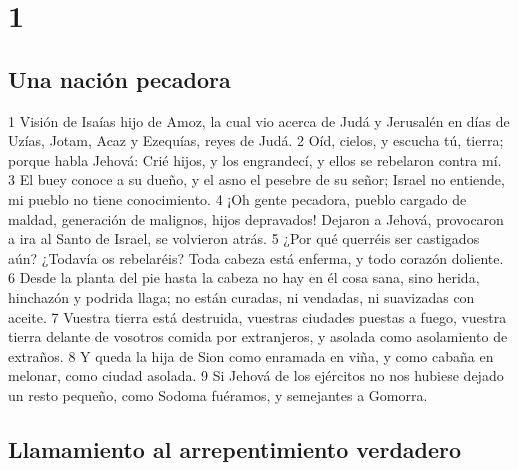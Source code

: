 
\chapter{1}

\section*{Una nación pecadora}

1 Visión de Isaías hijo de Amoz, la cual vio acerca de Judá y Jerusalén en días de Uzías, Jotam, Acaz y Ezequías, reyes de Judá.
2 Oíd, cielos, y escucha tú, tierra; porque habla Jehová: Crié hijos, y los engrandecí, y ellos se rebelaron contra mí.
3 El buey conoce a su dueño, y el asno el pesebre de su señor; Israel no entiende, mi pueblo no tiene conocimiento.
4 ¡Oh gente pecadora, pueblo cargado de maldad, generación de malignos, hijos depravados! Dejaron a Jehová, provocaron a ira al Santo de Israel, se volvieron atrás.
5 ¿Por qué querréis ser castigados aún? ¿Todavía os rebelaréis? Toda cabeza está enferma, y todo corazón doliente.
6 Desde la planta del pie hasta la cabeza no hay en él cosa sana, sino herida, hinchazón y podrida llaga; no están curadas, ni vendadas, ni suavizadas con aceite.
7 Vuestra tierra está destruida, vuestras ciudades puestas a fuego, vuestra tierra delante de vosotros comida por extranjeros, y asolada como asolamiento de extraños.
8 Y queda la hija de Sion como enramada en viña, y como cabaña en melonar, como ciudad asolada.
9 Si Jehová de los ejércitos no nos hubiese dejado un resto pequeño, como Sodoma fuéramos, y semejantes a Gomorra. 

\section*{Llamamiento al arrepentimiento verdadero}

